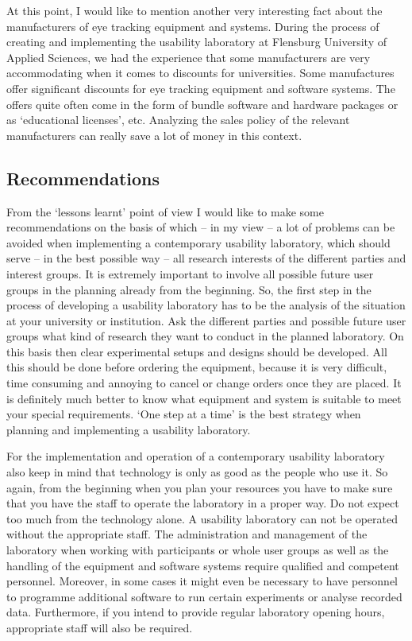 \documentclass[output=paper]{langsci/langscibook}
\begin{document}
At this point, I would like to mention another very interesting fact about the manufacturers of eye tracking equipment and systems. During the process of creating and implementing the usability laboratory at Flensburg University of Applied Sciences, we had the experience that some manufacturers are very accommodating when it comes to discounts for universities. Some manufactures offer significant discounts for eye tracking equipment and software systems. The offers quite often come in the form of bundle software and hardware packages or as `educational licenses', etc. Analyzing the sales policy of the relevant manufacturers can really save a lot of money in this context.


\subsection{Recommendations}

From the `lessons learnt' point of view I would like to make some recommendations on the basis of which -- in my view -- a lot of problems can be avoided when implementing a contemporary usability laboratory, which should serve -- in the best possible way -- all research interests of the different parties and interest groups. It is extremely important to involve all possible future user groups in the planning already from the beginning. So, the first step in the process of developing a usability laboratory has to be the analysis of the situation at your university or institution. Ask the different parties and possible future user groups what kind of research they want to conduct in the planned laboratory. On this basis then clear experimental setups and designs should be developed. All this should be done before ordering the equipment, because it is very difficult, time consuming and annoying to cancel or change orders once they are placed. It is definitely much better to know what equipment and system is suitable to meet your special requirements. `One step at a time' is the best strategy when planning and implementing a usability laboratory.


For the implementation and operation of a contemporary usability laboratory also keep in mind that technology is only as good as the people who use it. So again, from the beginning when you plan your resources you have to make sure that you have the staff to operate the laboratory in a proper way. Do not expect too much from the technology alone. A usability laboratory can not be operated without the appropriate staff. The administration and management of the laboratory when working with participants or whole user groups as well as the handling of the equipment and software systems require qualified and competent personnel. Moreover, in some cases it might even be necessary to have personnel to programme additional software to run certain experiments or analyse recorded data. Furthermore, if you intend to provide regular laboratory opening hours, appropriate staff will also be required. 
\end{document}
